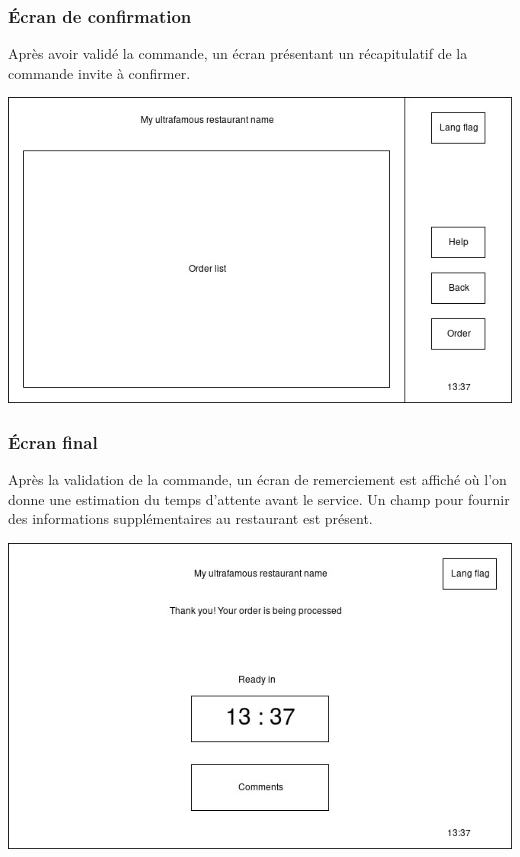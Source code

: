 \documentclass[a4paper,12pt]{article}
\begin{document}
\subsubsection{Écran de confirmation}
Après avoir validé la commande, un écran présentant un récapitulatif de la commande invite à confirmer.

\begin{center}
	\includegraphics[width=\textwidth]{confirmation_screen.jpg}
\end{center}

\subsubsection{Écran final}

Après la validation de la commande, un écran de remerciement est affiché où l'on donne une estimation du temps
d'attente avant le service. Un champ pour fournir des informations supplémentaires au restaurant est présent.

\begin{center}
	\includegraphics[width=\textwidth]{final_screen.jpg}
\end{center}
\end{document}
